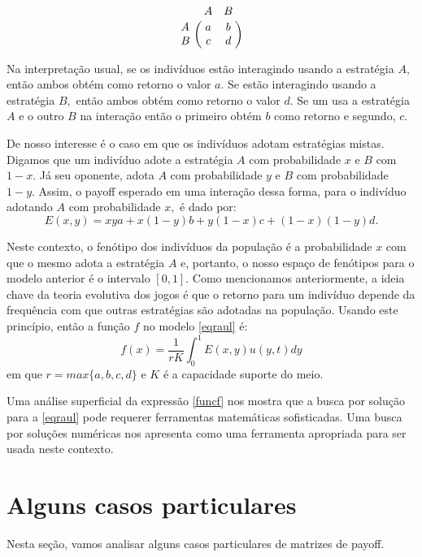 \documentclass[
	12pt,				%
	openany,			%
	oneoside,			%
	a4paper,			%
	english,			%
	spanish,			%
	brazil,				%
	]{abntex2}
\begin{document}
$$\bordermatrix{
&A&B\cr
A&a& b \cr
B &c&d
}$$

Na interpretação usual, se os indivíduos estão interagindo usando a estratégia $A,$ então ambos obtém como retorno o valor $a.$ Se  estão interagindo usando a estratégia $B,$  então ambos obtém como retorno o valor $d.$ Se um usa a estratégia $A$ e o outro $B$ na interação então o primeiro obtém $b$ como retorno e segundo, $c.$

De nosso interesse é o caso em que os indivíduos adotam estratégias mistas. Digamos que um indivíduo adote a estratégia $A$ com probabilidade $x$ e $B$ com $1-x$. Já seu oponente, adota $A$ com probabilidade $y$ e $B$ com probabilidade $1-y.$ Assim, o payoff esperado em uma interação dessa forma, para o indivíduo adotando $A$ com probabilidade $x,$ é dado por: $$E(x,y)=xya+x(1-y)b+y(1-x)c+(1-x)(1-y)d.$$ 

Neste contexto, o fenótipo dos indivíduos da população é a probabilidade $x$ com que o mesmo adota a estratégia $A$ e, portanto, o nosso espaço de fenótipos para o modelo anterior é o intervalo $[0,1].$
Como mencionamos anteriormente, a ideia chave da teoria evolutiva dos jogos é que o retorno para um indivíduo depende da frequência com que outras estratégias são adotadas na população. Usando este princípio, então a função $f$ no modelo \ref{eqraul} é:
\begin{equation}\label{funcf}
f(x)=\frac{1}{rK}\int_{0}^1E(x,y)u(y,t)dy
\end{equation}
em que $r=max\{a,b,c,d\}$ e $K$ é a capacidade suporte do meio.

Uma análise superficial da expressão \ref{funcf} nos mostra que a busca por solução para a \ref{eqraul} pode requerer ferramentas matemáticas sofisticadas. Uma busca por soluções numéricas nos apresenta como uma ferramenta apropriada para ser usada neste contexto.    

\section{Alguns casos particulares}
Nesta seção, vamos analisar alguns casos particulares de matrizes de payoff.
\end{document}
